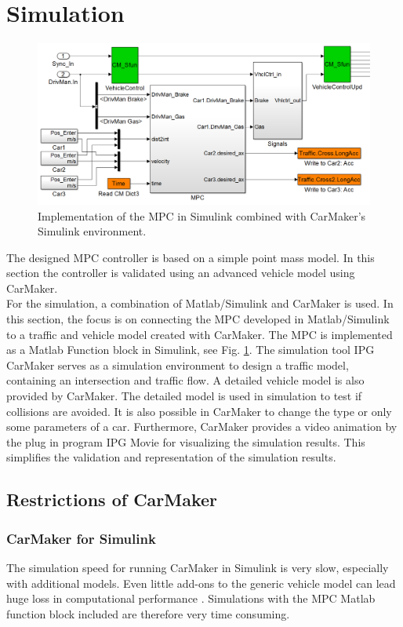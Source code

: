 \documentclass[letterpaper,10pt,conference]{ieeeconf}
\begin{document}
\section{Simulation} \label{sec:simulation}
\begin{figure}[]
    \centering
    \includegraphics[width=1.8\columnwidth]{CarMaker_Implement2.png}
    \caption{Implementation of the MPC in Simulink combined with CarMaker's Simulink environment.}
    \label{fig:CM_Implement}
\end{figure}
The designed MPC controller is based on a simple point mass model. In this section the controller is validated using an advanced vehicle model using CarMaker.\\ \indent
For the simulation, a combination of Matlab/Simulink and CarMaker is used. In this section, the focus is on connecting the MPC developed in Matlab/Simulink to a traffic and vehicle model created with CarMaker. The MPC is implemented as a Matlab Function block in Simulink, see Fig. \ref{fig:CM_Implement}. The simulation tool IPG CarMaker serves as a simulation environment to design a traffic model, containing an intersection and traffic flow. A detailed vehicle model is also provided by CarMaker. The detailed model is used in simulation to test if collisions are avoided. It is also possible in CarMaker to change the type or only some parameters of a car. Furthermore, CarMaker provides a video animation by the plug in program IPG Movie for visualizing the simulation results. This simplifies the validation and representation of the simulation results.
\subsection{Restrictions of CarMaker}
\subsubsection{CarMaker for Simulink}
The simulation speed for running CarMaker in Simulink is very slow, especially with additional models. Even little add-ons to the generic vehicle model can lead huge loss in computational performance \cite{qsguide}. Simulations with the MPC Matlab function block included are therefore very time consuming.
\end{document}
